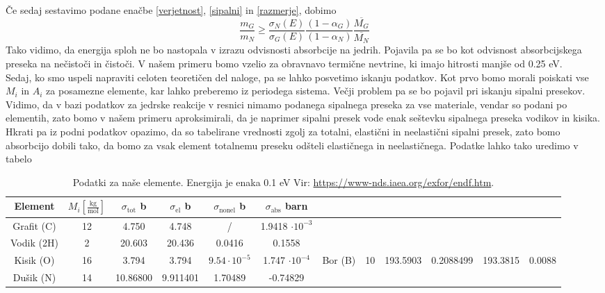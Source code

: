 \documentclass[slovene,11pt,a4paper]{article}
\begin{document}
Če sedaj sestavimo podane enačbe \eqref{verjetnost}, \eqref{sipalni} in \eqref{razmerje}, dobimo
\begin{equation}
    \frac{m_G}{m_N}\geq \frac{\sigma_N(E)}{\sigma_G(E)}\frac{(1-\alpha_G)}{(1-\alpha_N)}\frac{\overline{M_G}}{\overline{M_N}}
\end{equation}
Tako vidimo, da energija sploh ne bo nastopala v izrazu odvisnosti absorbcije na jedrih. Pojavila pa se bo kot odvisnost absorbcijskega preseka na nečistoči in čistoči. V našem primeru bomo vzelio za obravnavo termične nevtrine, ki imajo hitrosti manjše od 0.25 eV. \\
Sedaj, ko smo uspeli napraviti celoten teoretičen del naloge, pa se lahko posvetimo iskanju podatkov. Kot prvo bomo morali poiskati vse $M_i$ in $A_i$ za posamezne elemente, kar lahko preberemo iz periodega sistema. Večji problem pa se bo pojavil pri iskanju sipalni presekov. 
Vidimo, da v bazi podatkov za jedrske reakcije v resnici nimamo podanega sipalnega preseka za vse materiale, vendar so podani po elementih, zato bomo v našem primeru aproksimirali, da je naprimer sipalni presek vode enak seštevku sipalnega preseka vodikov in kisika. Hkrati pa iz podni podatkov opazimo, da so tabelirane vrednosti zgolj za totalni, elastični in neelastični sipalni presek, zato bomo absorbcijo dobili tako, da bomo za vsak element totalnemu preseku odšteli elastičnega in neelastičnega. Podatke lahko tako uredimo v tabelo
\begin{table}[h!]
\centering
 \begin{tabular}{|c | c | c | c | c|c|} 
 \hline
 Element & $M_i \left[\frac{\text{kg}}{\text{mol}}\right]$ & $\sigma_{\text{tot}}$ b& $\sigma_{\text{el}}$ b &  $\sigma_{\text{nonel}}$ b& $\sigma_{\text{abs}}$ barn  \\
 \hline
 Grafit (C) & 12& 4.750 & 4.748 & / & 1.9418 $\cdot 10^{-3}$ \\
 \hline
 Vodik (2H) & 2 &  20.603&  20.436 & 0.0416 & 0.1558 \\
 \hline
 Kisik (O) & 16 & 3.794 & 3.794 & $9.54\cdot 10^{-5}$ & 1.747 $\cdot 10^{-4}$&
 \hline
 Bor (B) & 10 & 193.5903 & 0.2088499 & 193.3815 & 0.0088 \\
 \hline
 Dušik (N) & 14 & 10.86800 & 9.911401 & 1.70489 & -0.74829 \\
 \hline
 \end{tabular}
 \caption{Podatki za naše elemente. Energija je enaka 0.1 eV Vir: \url{https://www-nds.iaea.org/exfor/endf.htm}.}
\end{table}
\end{document}

